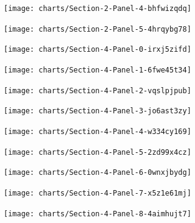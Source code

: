 \begin{figure}[!htb]
\texttt{[image: charts/Section-2-Panel-4-bhfwizqdq]}
\caption{}
\endminipage\hfill
{}
\texttt{[image: charts/Section-2-Panel-5-4hrqybg78]}
\caption{}
\endminipage
\end{figure}

\begin{figure}[!htb]
\texttt{[image: charts/Section-4-Panel-0-irxj5zifd]}
\caption{}
\endminipage\hfill
{}
\texttt{[image: charts/Section-4-Panel-1-6fwe45t34]}
\caption{}
\endminipage
\end{figure}

\begin{figure}[!htb]
\texttt{[image: charts/Section-4-Panel-2-vqslpjpub]}
\caption{}
\endminipage\hfill
{}
\texttt{[image: charts/Section-4-Panel-3-jo6ast3zy]}
\caption{}
\endminipage
\end{figure}

\begin{figure}[!htb]
\texttt{[image: charts/Section-4-Panel-4-w334cy169]}
\caption{}
\endminipage\hfill
{}
\texttt{[image: charts/Section-4-Panel-5-2zd99x4cz]}
\caption{}
\endminipage
\end{figure}

\begin{figure}[!htb]
\texttt{[image: charts/Section-4-Panel-6-0wnxjbydg]}
\caption{}
\endminipage\hfill
{}
\texttt{[image: charts/Section-4-Panel-7-x5z1e61mj]}
\caption{}
\endminipage
\end{figure}

\begin{figure}[!htb]
\texttt{[image: charts/Section-4-Panel-8-4aimhujt7]}
\caption{}
\endminipage
\end{figure}

